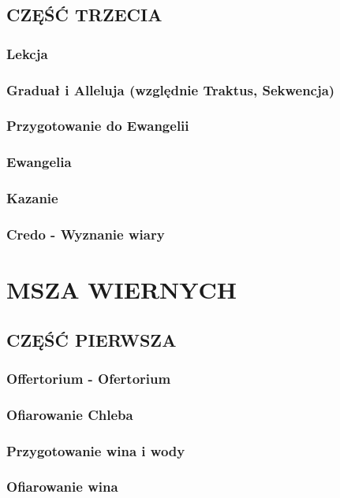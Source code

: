 \documentclass[10pt,titlepage]{article}
\begin{document}
	\subsection{CZĘŚĆ TRZECIA}
	
	\subsubsection{Lekcja }
	\subsubsection{Graduał i Alleluja (względnie Traktus, Sekwencja)}
	\subsubsection{Przygotowanie do Ewangelii}
	\subsubsection{Ewangelia}
	\subsubsection{Kazanie}
	\subsubsection{Credo - Wyznanie wiary}
	
	\section{MSZA WIERNYCH}
	
	\subsection{CZĘŚĆ PIERWSZA}
	
	\subsubsection{Offertorium - Ofertorium}
	\subsubsection{Ofiarowanie Chleba}
	\subsubsection{Przygotowanie wina i wody}
	\subsubsection{Ofiarowanie wina}
\end{document}
